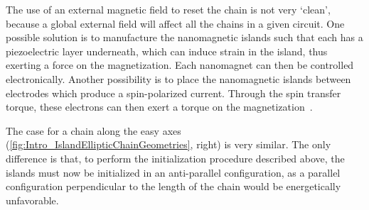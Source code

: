 \documentclass[11pt,a4paper,english]{article}
\begin{document}
The use of an external magnetic field to reset the chain is not very `clean', because a global external field will affect all the chains in a given circuit. One possible solution is to manufacture the nanomagnetic islands such that each has a piezoelectric layer underneath, which can induce strain in the island, thus exerting a force on the magnetization. Each nanomagnet can then be controlled electronically. Another possibility is to place the nanomagnetic islands between electrodes which produce a spin-polarized current. Through the spin transfer torque, these electrons can then exert a torque on the magnetization~\cite{SwitchingForced_EnergyEfficient,syllabus_PoAEaPD}. \par
The case for a chain along the easy axes (\cref{fig:Intro_IslandEllipticChainGeometries}, right) is very similar. The only difference is that, to perform the initialization procedure described above, the islands must now be initialized in an anti-parallel configuration, as a parallel configuration perpendicular to the length of the chain would be energetically unfavorable.
\end{document}
